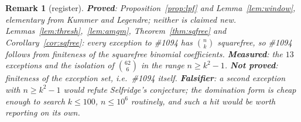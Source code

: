 \documentclass[11pt]{article}
\newtheorem{remark}[theorem]{Remark}
\begin{document}
\begin{remark}[register]
\textbf{Proved}: Proposition~\ref{prop:lpf} and Lemma~\ref{lem:window}, elementary from
Kummer and Legendre; neither is claimed new.  Lemmas~\ref{lem:thresh},~\ref{lem:amgm},
Theorem~\ref{thm:sqfree} and Corollary~\ref{cor:sqfree}: every exception to \#1094 has
$\binom nk$ squarefree, so \#1094 follows from finiteness of the squarefree binomial
coefficients.  \textbf{Measured}: the $13$ exceptions and the
isolation of $\binom{62}{6}$ in the range $n\ge k^2-1$.  \textbf{Not proved}: finiteness of
the exception set, i.e.\ \#1094 itself.  \textbf{Falsifier}: a second exception with
$n\ge k^{2}-1$ would refute Selfridge's conjecture; the domination form is cheap enough to
search $k\le100$, $n\le10^{6}$ routinely, and such a hit would be worth reporting on its own.
\end{remark}
\end{document}
